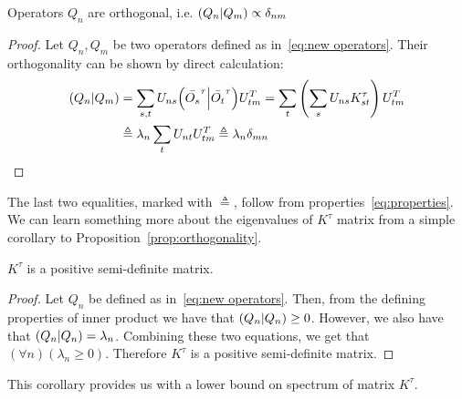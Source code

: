 \begin{proposition}
Operators \(Q_n\) are orthogonal, i.e. \(\left(Q_n \middle| Q_m\right) \propto \delta_{nm}\)
\label{prop:orthogonality}
\end{proposition}
\begin{proof}
  Let \(Q_n,Q_m\) be two operators defined as in~\eqref{eq:new operators}.
  Their orthogonality can be shown by direct calculation:
  \begin{align*}
    \left(Q_n \middle| Q_m\right) &= \sum_{s,t} U_{ns} {\left(\bar{O_s}^{\tau} \middle| \bar{O_t}^{\tau}\right)} U_{tm}^{T} 
    = \sum_{t} \left(\sum_{s}U_{ns} K_{st}^{\tau}\right)  U_{tm}^{T} \\ 
    &\triangleq \lambda_n \sum_t U_{nt} U_{tm}^{T} \triangleq \lambda_n \delta_{mn}
  \end{align*}
\end{proof}
The last two equalities, marked with \(\triangleq \), follow from properties~\eqref{eq:properties}. We can learn something more
about the eigenvalues of \(K^{\tau}\) matrix from a simple corollary to Proposition~\ref{prop:orthogonality}.
\begin{corollary}
  \(K^{\tau}\) is a positive semi-definite matrix.\label{corr:psd}
\end{corollary}
\begin{proof}
Let \(Q_n\) be defined as in~\eqref{eq:new operators}. Then, from the defining properties of inner product we have that
\(\left(Q_n \middle| Q_n\right) \geq 0\). However, we also have that \(\left(Q_n \middle| Q_n\right) = \lambda_n\). Combining these two equations, we get
that \(\left(\forall n\right) \left(\lambda_n \geq 0\right)\). Therefore \(K^{\tau}\) is a positive semi-definite matrix.
\end{proof}
This corollary provides us with a lower bound on spectrum of matrix \(K^{\tau}\). 

